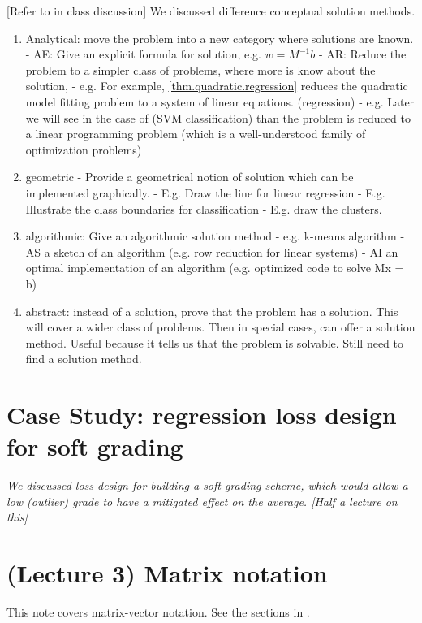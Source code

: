 \documentclass[12pt]{amsart}
\begin{document}
[Refer to in class discussion]
We discussed difference conceptual solution methods. 
\begin{enumerate}
	\item  Analytical: move the problem into a new category where solutions are known. 
  - AE: Give an explicit formula for solution, e.g. $w = M^{-1}b$
  - AR: Reduce the problem to a simpler class of problems, where more is know about the solution, 
    - e.g.  For example, \autoref{thm.quadratic.regression} reduces the quadratic model fitting problem to a system of linear equations.  
 (regression)
    - e.g. Later we will see in the case of  (SVM classification)
 than the problem is reduced to a linear programming problem (which is a well-understood family of optimization problems)     
  \item  geometric
  - Provide a geometrical notion of solution which can be implemented graphically.
  - E.g. Draw the line for linear regression
  - E.g. Illustrate the class boundaries for classification
  - E.g. draw the clusters. 
 \item algorithmic: Give an algorithmic solution method
  - e.g. k-means algorithm
  - AS a sketch of an algorithm (e.g. row reduction for linear systems)
  - AI an optimal implementation of an algorithm (e.g. optimized code to solve Mx = b)
 \item abstract: instead of a solution, prove that the problem has a solution. This will cover a wider class of problems.  Then in special cases, can offer a solution method.   Useful because it tells us that the problem is solvable.   Still need to find a solution method.  \end{enumerate}



\section{Case Study: regression loss design for soft grading}

\emph{We discussed loss design for building a soft grading scheme, which would allow a low (outlier) grade to have a mitigated effect on the average. [Half a lecture on this]}






\section{(Lecture 3) Matrix notation}
This note covers matrix-vector notation.  See the sections in \cite{deisenroth2020mathematics}. 
\end{document}
